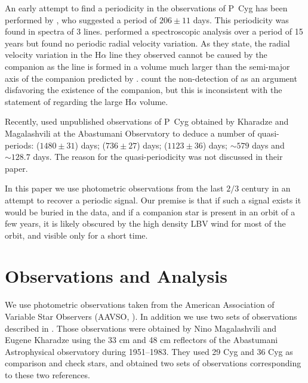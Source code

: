 \documentclass[twocolumn]{aastex62}
\begin{document}
An early attempt to find a periodicity in the observations of P~Cyg has been performed by \cite{Israelianetal1996}, who suggested a period of $206 \pm 11$ days.
This periodicity was found in spectra of  {3} lines.
\cite{Richardsonetal2011} performed a spectroscopic analysis over a period of 15 years but found no periodic radial velocity variation. As they state, the radial velocity variation in the H$\alpha$ line they observed cannot be caused by the companion as the line is formed in a volume much larger than the semi-major axis of the companion predicted by \citet{Kashi2010}.
\cite{Richardsonetal2013} count the non-detection of \cite{Richardsonetal2011} as an argument disfavoring the existence of the companion, but this is inconsistent with the statement of \cite{Richardsonetal2011} regarding the large H$\alpha$ volume.

Recently, \cite{Kochiashvilietal2018} used unpublished observations of P~Cyg obtained by Kharadze and Magalashvili at the Abastumani Observatory to deduce a number of quasi-periods:
($1480 \pm 31$) days; ($736 \pm 27$) days; ($1123 \pm 36$) days; $\sim 579$ days and  $\sim128.7$ days.
The reason for the quasi-periodicity was not discussed in their paper.

In this paper we use photometric observations from the last $2/3$ century in an attempt to recover a periodic signal.
Our premise is that if such a signal exists it would be buried in the data, and if a companion star is present in an orbit of a few years, it is likely
obscured by the high density LBV wind for most of the orbit, and visible only for a short time.


\section{Observations and Analysis}
\label{sec:observations}

We use photometric observations taken from the American Association of Variable Star Observers (AAVSO, \citealt{Kafka2018}).
In addition we use two sets of observations described in \cite{Kochiashvilietal2018}.
Those observations were obtained by Nino Magalashvili and Eugene Kharadze using the 33 cm and 48 cm reflectors of the Abastumani Astrophysical observatory during 1951--1983. They used 29 Cyg and 36 Cyg as comparison and check stars, and obtained two sets of observations corresponding to these two references.
\end{document}
